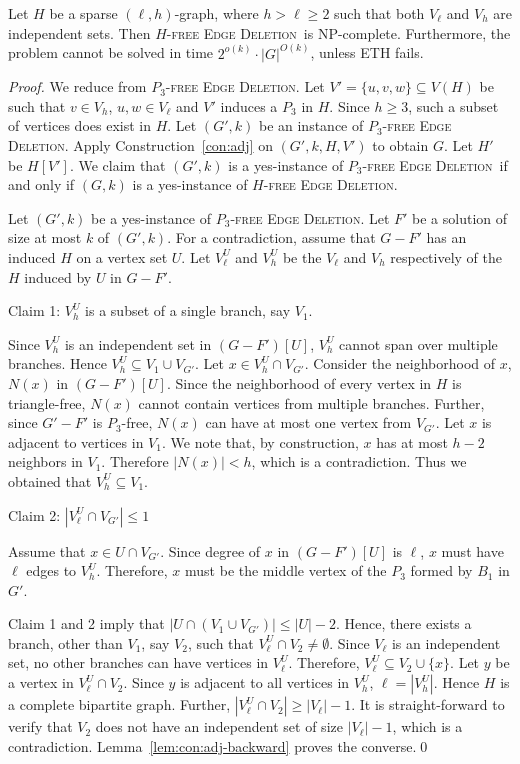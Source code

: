 \documentclass[envcountsame,envcountsect,10pt,oribibl]{llncs}
\newcommand{\pname}[1]{\textnormal{\textsc{#1}}}
\newcommand{\cclass}[1]{\textnormal{\textsf{#1}}}
\newcommand{\HED}{\pname{$H$-free Edge Deletion}}
\newcommand{\PTED}{\pname{$P_3$-free Edge Deletion}}
\newcommand{\NPC}{\cclass{NP-complete}}
\begin{document}
\begin{lemma}
  \label{lem:lhbipartite}
  Let $H$ be a sparse $(\ell,h)$-graph, where $h>\ell\geq 2$ such that both $V_{\ell}$ and $V_h$
  are independent sets.
  Then \HED\ is \NPC. Furthermore, the problem cannot be solved in time
  $2^{o(k)}\cdot |G|^{O(k)}$, unless ETH fails.
\end{lemma}
\begin{proof}
  We reduce from \PTED. Let $V'=\{u,v,w\}\subseteq V(H)$ be such that
  $v\in V_h$, $u,w\in V_{\ell}$ and $V'$ induces a $P_3$ in $H$.
  Since $h\geq 3$, such a subset of vertices does exist in $H$.
  Let $(G',k)$ be an instance of \PTED.
  Apply Construction~\ref{con:adj} on $(G',k,H,V')$
  to obtain $G$. Let $H'$ be $H[V']$. 
  We claim that $(G',k)$ is a yes-instance of \PTED\ if and only if 
  $(G,k)$ is a yes-instance of \HED.

  Let $(G',k)$ be a yes-instance of \PTED. Let $F'$ be a solution
  of size at most $k$ of $(G',k)$. For a contradiction, assume that
  $G-F'$ has an induced $H$ on a vertex set $U$. Let $V^U_{\ell}$ and
  $V^U_{h}$ be the $V_{\ell}$ and $V_h$ respectively of the $H$ induced by
  $U$ in $G-F'$.

  Claim 1: $V^U_{h}$ is a subset of a single branch, say $V_1$.

  Since $V^U_h$
  is an independent set in $(G-F')[U]$, 
  $V^U_{h}$ cannot span over multiple branches. Hence $V^U_{h}\subseteq V_1\cup V_{G'}$.
  Let $x\in V^U_h\cap V_{G'}$. Consider the neighborhood of $x$, $N(x)$ in $(G-F')[U]$.
  Since the neighborhood of every vertex in $H$ is triangle-free, $N(x)$ cannot 
  contain vertices from multiple branches. Further, since $G'-F'$ is $P_3$-free, 
  $N(x)$ can have at most one vertex from $V_{G'}$. Let $x$ is adjacent to vertices in $V_1$. 
  We note that, by construction, 
  $x$ has at most $h-2$ neighbors in $V_1$. Therefore $|N(x)|<h$, which is a contradiction.
  Thus we obtained that $V^U_h\subseteq V_1$.

  Claim 2: $|V^U_{\ell}\cap V_{G'}|\leq 1$

  Assume that $x\in U\cap V_{G'}$.
  Since degree of $x$ in $(G-F')[U]$ is $\ell$, $x$ must have $\ell$
  edges to $V^U_h$. Therefore, $x$ must be the middle vertex of the 
  $P_3$ formed by $B_1$ in $G'$. 

  Claim 1 and 2 imply that $|U\cap (V_1\cup V_{G'})| \leq |U|-2$. Hence,
  there exists a branch, other than
  $V_1$, say $V_2$, such that $V^U_{\ell}\cap V_2\neq \emptyset$. Since $V_{\ell}$ is an independent set,
  no other branches can have vertices in $V^U_{\ell}$. Therefore,
  $V^U_{\ell}\subseteq V_2\cup \{x\}$. Let $y$ be a vertex in $V^U_{\ell}\cap V_2$.
  Since $y$ is adjacent to all vertices in $V^U_{h}$, $\ell=|V^U_h|$.
  Hence $H$ is a complete bipartite graph. Further, $|V^U_{\ell}\cap V_2|\geq |V_{\ell}|-1$.
  It is straight-forward to verify that $V_2$ does not have an independent set of size 
  $|V_{\ell}|-1$, which is a contradiction.
  Lemma~\ref{lem:con:adj-backward} proves the converse.\qed
\end{proof}
\end{document}
